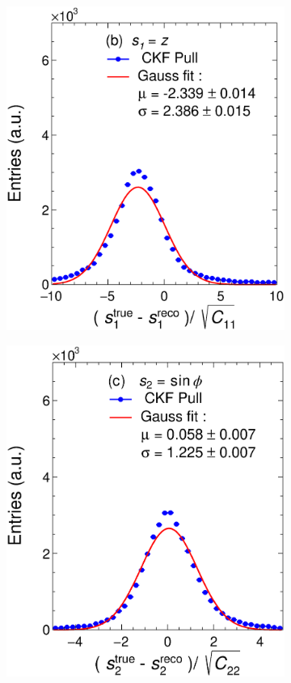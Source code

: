 \begin{figure}[t]
\begin{subfigure}{0.32\textwidth}
         \includegraphics[width=\textwidth]{figures/ch5-KF_NDGAr/FullSample/Int/Units/Unit1.eps}
         \caption{}
         \label{fig:resp1KFGAr_Int}
     \end{subfigure}
    \begin{subfigure}{0.32\textwidth}
         \centering
         \includegraphics[width=\textwidth]{figures/ch5-KF_NDGAr/FullSample/Int/Units/Unit2.eps}

\end{subfigure}
\end{figure}

